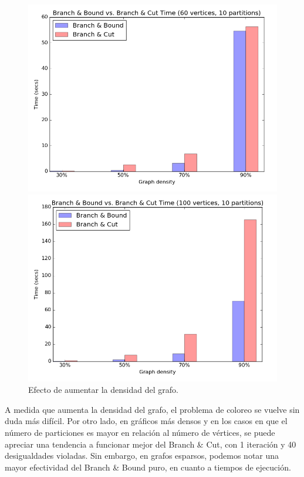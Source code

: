 \begin{figure}[h]
\begin{minipage}[b]{0.49\textwidth}
  \end{minipage}
  \begin{minipage}[b]{0.49\textwidth}
    \includegraphics[width=\textwidth]{img/1-bb_vs_bc_v60_p10_i1_co0_l40_t1_b0.png}
  \end{minipage}
  \hfill
  \begin{minipage}[b]{0.49\textwidth}
    \includegraphics[width=\textwidth]{img/1-bb_vs_bc_v100_p10_i1_co0_l40_t1_b0.png}
  \end{minipage}
	\caption{Efecto de aumentar la densidad del grafo.}
\end{figure}

A medida que aumenta la densidad del grafo, el problema de coloreo se vuelve sin duda más difícil. Por otro lado, en gráficos más densos y en los casos en que el número de particiones es mayor en relación al número de vértices, se puede apreciar una tendencia  a funcionar mejor del Branch \& Cut, con 1 iteración y 40 desigualdades violadas. Sin embargo, en grafos esparsos, podemos notar una mayor efectividad del Branch \& Bound puro, en cuanto a tiempos de ejecución.

